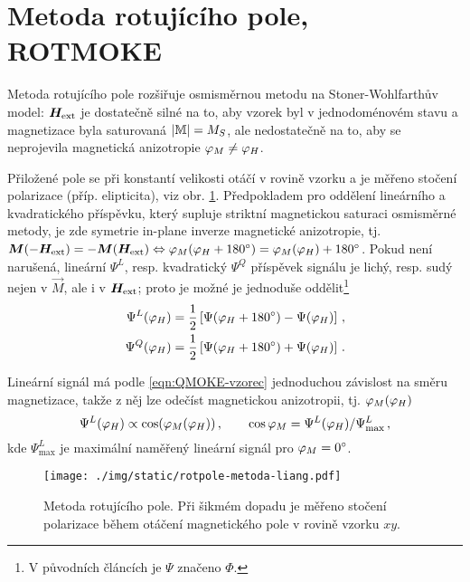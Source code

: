 \section{Metoda rotujícího pole, ROTMOKE}
\label{chap:ROTMOKE}

Metoda rotujícího pole\cite{liangSeparationLinearQuadratic2015,liangQuantitativeStudyQuadratic2015} rozšiřuje osmisměrnou metodu na Stoner-Wohlfarthův model: $\bm{H}_\textrm{ext}$ je dostatečně silné na to, aby vzorek byl v jednodoménovém stavu a magnetizace byla saturovaná $|\mathbb{M}|=M_S$, ale nedostatečně na to, aby se neprojevila magnetická anizotropie $\varphi_M\neq\varphi_H$.

Přiložené pole se při konstantí velikosti otáčí v rovině vzorku a je měřeno stočení polarizace (příp. elipticita), viz obr. \ref{fig:metoda-rotujiciho-pole}.
Předpokladem pro oddělení lineárního a kvadratického příspěvku, který supluje striktní magnetickou saturaci osmisměrné metody,
je zde symetrie in-plane inverze magnetické anizotropie, tj. $\bm{M}(-\bm{H}_\textrm{ext})=-\bm{M}(\bm{H}_\textrm{ext}) \Leftrightarrow \varphi_M(\varphi_H+\SI{180}{\degree})=\varphi_M(\varphi_H)+\SI{180}{\degree}$.
Pokud není narušená, lineární $\Psi^L$, resp. kvadratický $\Psi^Q$ příspěvek signálu je lichý, resp. sudý nejen v $\vec{M}$, ale i v $\bm{H}_\textrm{ext}$;
proto je možné je jednoduše oddělit\footnote{V původních článcích je $\Psi$ značeno $\Phi$.}
\begin{align}
    \Psi^L(\varphi_H)&=\frac{1}{2} \left[ \Psi(\varphi_H+\SI{180}{\degree}) - \Psi(\varphi_H) \right] 
    \,, \\ \Psi^Q(\varphi_H)&=\frac{1}{2} \left[ \Psi(\varphi_H+\SI{180}{\degree}) + \Psi(\varphi_H) \right] \,.
\end{align}

Lineární signál má podle \eqref{eqn:QMOKE-vzorec} jednoduchou závislost na směru magnetizace, takže z něj lze odečíst magnetickou anizotropii, tj. $\varphi_M(\varphi_H)$
\begin{equation}
    \Psi^L(\varphi_H)\propto \cos(\varphi_M(\varphi_H)) \,, \qquad \cos \varphi_M=\Psi^L(\varphi_H)/\Psi^L_\textrm{max} \,,
\end{equation}
kde $\Psi^L_\textrm{max}$ je maximální naměřený lineární signál pro $\varphi_M=\SI{0}{\degree}$.

\begin{figure}[htbp]
    \centering
    \texttt{[image: ./img/static/rotpole-metoda-liang.pdf]}
    \caption{Metoda rotujícího pole.
    Při šikmém dopadu je měřeno stočení polarizace během otáčení magnetického pole v rovině vzorku $xy$. \cite{liangQuantitativeStudyQuadratic2015}}
    \label{fig:metoda-rotujiciho-pole}
\end{figure}

